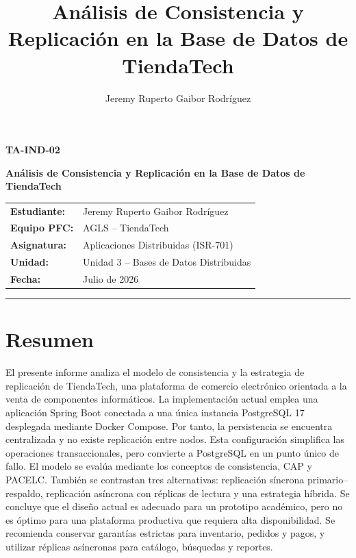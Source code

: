 \documentclass[11pt,a4paper]{article}
\title{\textbf{Análisis de Consistencia y Replicación en la Base de Datos de TiendaTech}}
\author{Jeremy Ruperto Gaibor Rodríguez}
\date{}
\begin{document}
\begin{center}
    {\Large \textbf{TA-IND-02}\par}
    \vspace{0.4cm}
    {\Large \textbf{Análisis de Consistencia y Replicación en la Base de Datos de TiendaTech}\par}
    \vspace{0.8cm}

    \begin{tabular}{ll}
        \textbf{Estudiante:} & Jeremy Ruperto Gaibor Rodríguez \\[0.15cm]
        \textbf{Equipo PFC:} & AGLS -- TiendaTech \\[0.15cm]
        \textbf{Asignatura:} & Aplicaciones Distribuidas (ISR-701) \\[0.15cm]
        \textbf{Unidad:} & Unidad 3 -- Bases de Datos Distribuidas \\[0.15cm]
        \textbf{Fecha:} & Julio de 2026 \\
    \end{tabular}
\end{center}

\vspace{1cm}
\hrule
\vspace{0.5cm}

\section*{Resumen}
El presente informe analiza el modelo de consistencia y la estrategia de replicación de TiendaTech, una plataforma de comercio electrónico orientada a la venta de componentes informáticos. La implementación actual emplea una aplicación Spring Boot conectada a una única instancia PostgreSQL 17 desplegada mediante Docker Compose. Por tanto, la persistencia se encuentra centralizada y no existe replicación entre nodos. Esta configuración simplifica las operaciones transaccionales, pero convierte a PostgreSQL en un punto único de fallo. El modelo se evalúa mediante los conceptos de consistencia, CAP y PACELC. También se contrastan tres alternativas: replicación síncrona primario--respaldo, replicación asíncrona con réplicas de lectura y una estrategia híbrida. Se concluye que el diseño actual es adecuado para un prototipo académico, pero no es óptimo para una plataforma productiva que requiera alta disponibilidad. Se recomienda conservar garantías estrictas para inventario, pedidos y pagos, y utilizar réplicas asíncronas para catálogo, búsquedas y reportes.
\end{document}
